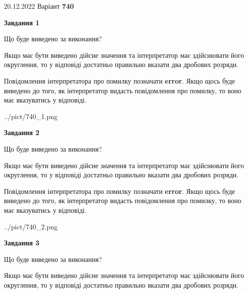 \documentclass[12pt, ukrainian]{article}
\begin{document}
{20.12.2022 Варіант \No \textbf { 740 }\par}
{
\begin {Large}

{\begin {center}\textbf{Завдання 1}\end {center}}\par
Що буде виведено за виконання? \par

Якщо має бути виведено дійсне значення та інтерпретатор має здійснювати його округлення, 
то у відповіді достатньо правильно вказати два дробових розряди.

Повідомлення інтерпретатора про помилку позначати \textbf{error}.
Якщо щось буде виведено до того, як інтерпретатор видасть повідомлення про помилку, 
то воно має вказуватись у відповіді. \par

\begin{center}
	{../pict/740_1.png}
\end{center}
\newpage

{\begin {center}\textbf{Завдання 2}\end {center}}\par
Що буде виведено за виконання? \par

Якщо має бути виведено дійсне значення та інтерпретатор має здійснювати його округлення, 
то у відповіді достатньо правильно вказати два дробових розряди.

Повідомлення інтерпретатора про помилку позначати \textbf{error}.
Якщо щось буде виведено до того, як інтерпретатор видасть повідомлення про помилку, 
то воно має вказуватись у відповіді. \par

\begin{center}
	{../pict/740_2.png}
\end{center}
\newpage

{\begin {center}\textbf{Завдання 3}\end {center}}\par
Що буде виведено за виконання? \par

Якщо має бути виведено дійсне значення та інтерпретатор має здійснювати його округлення, 
то у відповіді достатньо правильно вказати два дробових розряди.


\end{Large}}
\end{document}
